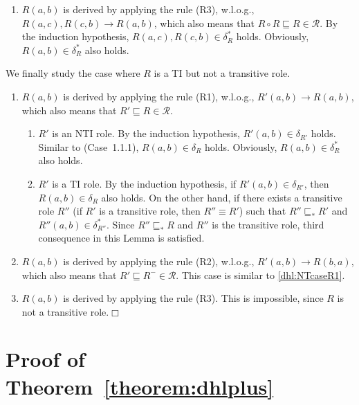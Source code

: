 \begin{enumerate}[leftmargin=12ex,label=Case~2.\arabic*, ref=Case~2.\arabic*]
\item $R(a,b)$ is derived by applying the rule (R3), w.l.o.g., $R(a,c),R(c,b)\rightarrow R(a,b)$,
    which also means that $R\circ R\sqsubseteq R\in\mathcal{R}$. By the induction hypothesis,
    $R(a,c),R(c,b)\in\delta_{R}^*$ holds. Obviously, $R(a,b)\in\delta_{R}^*$ also holds.
\end{enumerate}

We finally study the case where $R$ is a TI but not a transitive role.

\begin{enumerate}[leftmargin=12ex,label=Case~3.\arabic*, ref=Case~3.\arabic*]
\item $R(a,b)$ is derived by applying the rule (R1), w.l.o.g., $R'(a,b)\rightarrow R(a,b)$,
    which also means that $R'\sqsubseteq R\in\mathcal{R}$.\label{dhl:NTcaseR1}
    \begin{enumerate}[leftmargin=8ex,label=Case~3.1.\arabic*]
    \item $R'$ is an NTI role. By the induction hypothesis, $R'(a,b)\in\delta_{R'}$ holds.
        Similar to (Case~1.1.1), $R(a,b)\in\delta_{R}$ holds.
        Obviously, $R(a,b)\in\delta_{R}^*$ also holds.

    \item $R'$ is a TI role. By the induction hypothesis, if $R'(a,b)\in\delta_{R'}$,
        then $R(a,b)\in\delta_R$ also holds. On the other hand, if there exists a transitive role
        $R''$ (if $R'$ is a transitive role, then $R''\equiv R'$) such that
        $R''\sqsubseteq_* R'$ and $R''(a,b)\in\delta_{R''}^*$. Since $R''\sqsubseteq_* R$ and
        $R''$ is the transitive role, third consequence in this Lemma is satisfied.
    \end{enumerate}

\item $R(a,b)$ is derived by applying the rule (R2), w.l.o.g., $R'(a,b)\rightarrow R(b,a)$,
    which also means that $R'\sqsubseteq R^-\in\mathcal{R}$. This case is similar to \ref{dhl:NTcaseR1}.

\item $R(a,b)$ is derived by applying the rule (R3). This is impossible, since $R$ is not a transitive
    role.\hfill$\Box$
\end{enumerate}


\section{Proof of Theorem~\ref{theorem:dhlplus}}

